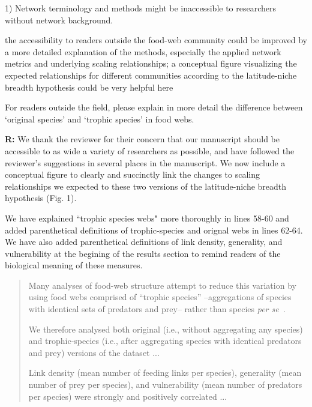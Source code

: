 \documentclass[12pt]{letter}
\newenvironment{refquote}{\bigskip \begin{it}}{\end{it}\smallskip}
\begin{document}
  1) Network terminology and methods might be inaccessible to researchers
  without network background.

  \begin{refquote}

    the accessibility to readers outside the food-web community could be
    improved by a more detailed explanation of the methods, especially the
    applied network metrics and underlying scaling relationships; a conceptual
    figure visualizing the expected relationships for different communities
    according to the latitude-niche breadth hypothesis could be very helpful
    here

    \smallskip

     For readers outside the field, please explain in more detail the
     difference between `original species' and `trophic species' in food webs.

  \end{refquote}


  \textbf{R:} We thank the reviewer for their concern that our manuscript
  should be accessible to as wide a variety of researchers as possible, and
  have followed the reviewer's suggestions in several places in the manuscript.
  We now include a conceptual figure to clearly and succinctly link the changes
  to scaling relationships we expected to these two versions of the latitude-niche
  breadth hypothesis (Fig. 1).


  We have explained ``trophic species webs" more thoroughly
  in lines 58-60 and added parenthetical definitions of
  trophic-species and orignal webs in lines 62-64. We have also added parenthetical definitions
  of link density, generality, and vulnerability at the begining of the results section
  to remind readers of the biological meaning of these measures.

  \begin{quotation}

    Many analyses of food-web structure attempt to reduce 
    this variation by using food webs comprised of ``trophic
    species'' --aggregations of species with identical sets 
    of predators and prey-- rather than species 
    \emph{per se}~\cite{Martinez1991,Dunne2004,Vermaat2009,Dunne2013}.

    \smallskip

    We therefore analysed both original (i.e., without 
    aggregating any species) and trophic-species (i.e., 
    after aggregating species with identical predators and 
    prey) versions of the dataset ...

    \smallskip

    Link density (mean number of feeding links per 
    species), generality (mean number of prey per species), 
    and vulnerability (mean number of predators per 
    species) were strongly and positively correlated ...

  \end{quotation}
\end{document}
